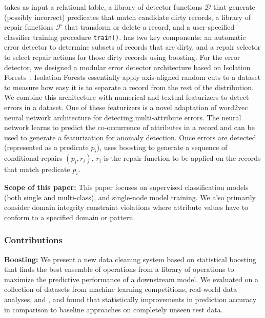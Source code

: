 \sys takes as input a relational table, a library of detector functions $\mathcal{D}$ that generate (possibly incorrect) predicates that match candidate dirty records, a library of repair functions $\mathcal{F}$ that transform or delete a record, and a user-specified classifier training procedure \texttt{train()}.
\sys has two key components: an automatic error detector to determine subsets of records that are dirty, and a repair selector to select repair actions for those dirty records using boosting.
For the error detector, we designed a modular error detector architecture based on Isolation Forests~\cite{liu2008isolation}.
Isolation Forests essentially apply axis-aligned random cuts to a dataset to measure how easy it is to separate a record from the rest of the distribution.
We combine this architecture with numerical and textual featurizers to detect errors in a dataset.
One of these featurizers is a novel adaptation of \textsf{word2vec} neural network architecture for detecting multi-attribute errors.
The neural network learns to predict the co-occurrence of attributes in a record and can be used to generate a featurization for anomaly detection.
Once errors are detected (represented as a predicate $p_i$), \sys uses boosting to generate a sequence of conditional repairs $(p_i, r_i)$,  $r_i$ is the repair function to be applied on the records that match predicate $p_i$.

\vspace{0.25em}\noindent\textbf{Scope of this paper: } This paper focuses on supervised classification models (both single and multi-class), and single-node model training.
We also primarily consider domain integrity constraint violations where attribute values have to conform to a specified domain or pattern.

\subsubsection*{Contributions}

\vspace{0.25em}\noindent\textbf{Boosting: } We present a new data cleaning system based on statistical boosting that finds the best ensemble of operations from a library of operations to maximize the predictive performance of a downstream model. We evaluated \sys on a collection of datasets from machine learning competitions, real-world data analyses, and \company, and found that statistically improvements in prediction accuracy in comparison to baseline approaches on completely unseen test data. 

